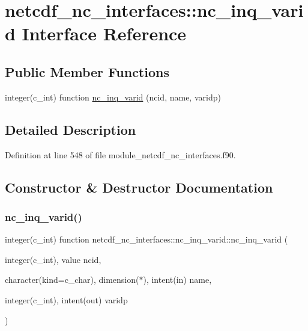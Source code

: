 \hypertarget{interfacenetcdf__nc__interfaces_1_1nc__inq__varid}{}\section{netcdf\+\_\+nc\+\_\+interfaces\+:\+:nc\+\_\+inq\+\_\+varid Interface Reference}
\label{interfacenetcdf__nc__interfaces_1_1nc__inq__varid}
\subsection*{Public Member Functions}
\begin{DoxyCompactItemize}
\item 
integer(c\+\_\+int) function \hyperlink{interfacenetcdf__nc__interfaces_1_1nc__inq__varid_a4abbd94b83200de1e0fbd001a3970d79}{nc\+\_\+inq\+\_\+varid} (ncid, name, varidp)
\end{DoxyCompactItemize}


\subsection{Detailed Description}


Definition at line 548 of file module\+\_\+netcdf\+\_\+nc\+\_\+interfaces.\+f90.



\subsection{Constructor \& Destructor Documentation}
\mbox{\label{interfacenetcdf__nc__interfaces_1_1nc__inq__varid_a4abbd94b83200de1e0fbd001a3970d79}} 
\subsubsection{\texorpdfstring{nc\+\_\+inq\+\_\+varid()}{nc\_inq\_varid()}}
{\footnotesize\ttfamily integer(c\+\_\+int) function netcdf\+\_\+nc\+\_\+interfaces\+::nc\+\_\+inq\+\_\+varid\+::nc\+\_\+inq\+\_\+varid (\begin{DoxyParamCaption}\item[{integer(c\+\_\+int), value}]{ncid,  }\item[{character(kind=c\+\_\+char), dimension($\ast$), intent(in)}]{name,  }\item[{integer(c\+\_\+int), intent(out)}]{varidp }\end{DoxyParamCaption})}



